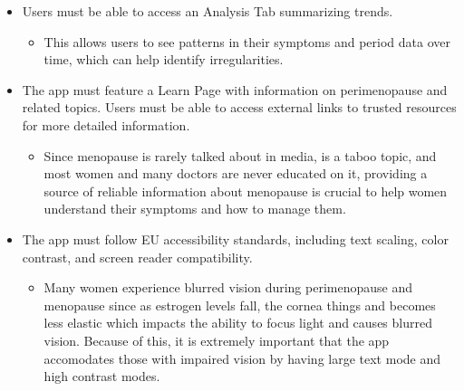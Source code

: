 \begin{itemize}
      \item Users must be able to access an Analysis Tab summarizing trends.
        \begin{itemize}
          \item This allows users to see patterns in their symptoms and period data over time, which can help identify irregularities\cite{Brambilla1994}.
        \end{itemize}
      \item The app must feature a Learn Page with information on perimenopause and related topics. Users must be able to access external links to trusted resources for more detailed information.
        \begin{itemize}
          \item Since menopause is rarely talked about in media, is a taboo topic, and most women and many doctors are never educated on it, providing a source of reliable information about menopause is crucial to help women understand their symptoms and how to manage them\cite{Aljumah2023}\cite{MenopauseSupport2021}\cite{Muir2022}.
        \end{itemize}
      \item The app must follow EU accessibility standards, including text scaling, color contrast, and screen reader compatibility.
        \begin{itemize}
          \item  Many women experience blurred vision during perimenopause and menopause since as estrogen levels fall, the cornea things and becomes less elastic which impacts the ability to focus light and causes blurred vision. Because of this, it is extremely important that the app accomodates those with impaired vision by having large text mode and high contrast modes\cite{KellyDonel2023}.
        \end{itemize}      
\end{itemize}


